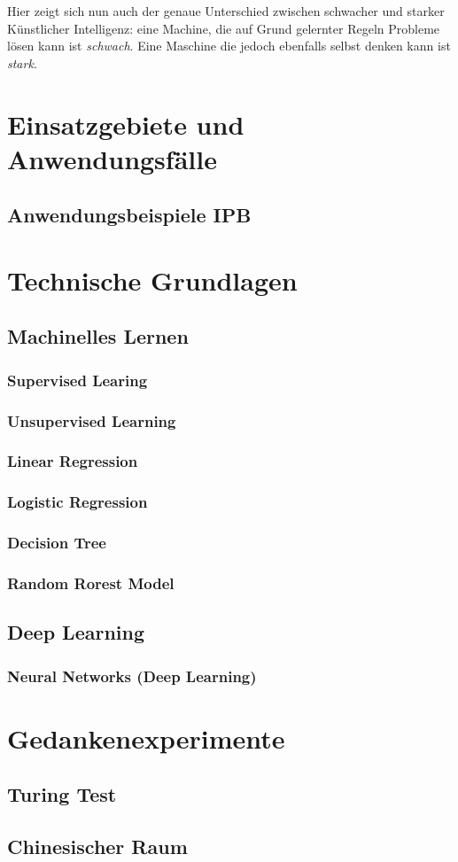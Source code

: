 \documentclass[12pt]{report}
\begin{document}
    Hier zeigt sich nun auch der genaue Unterschied zwischen schwacher und starker Künstlicher Intelligenz: eine Machine,
    die auf Grund gelernter Regeln Probleme lösen kann ist \emph{schwach}. Eine Maschine die jedoch ebenfalls selbst denken
    kann ist \emph{stark}.


    \section{Einsatzgebiete und Anwendungsfälle}
    \subsection{Anwendungsbeispiele IPB}

    \section{Technische Grundlagen}
    \subsection{Machinelles Lernen}
    \subsubsection{Supervised Learing}
    \subsubsection{Unsupervised Learning}
    \subsubsection{Linear Regression}
    \subsubsection{Logistic Regression}
    \subsubsection{Decision Tree}
    \subsubsection{Random Rorest Model}

    \subsection{Deep Learning}
    \subsubsection{Neural Networks (Deep Learning)}
    \section{Gedankenexperimente}
    \subsection{Turing Test}
    \subsection{Chinesischer Raum}


    \printbibliography
\end{document}
